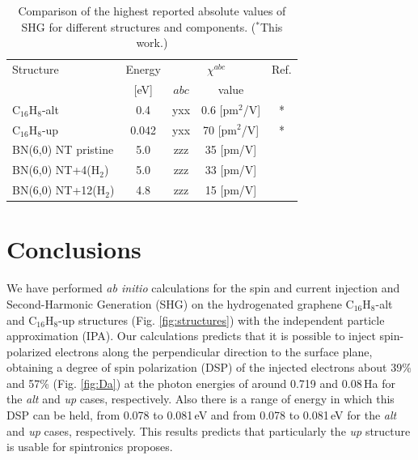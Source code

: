 \documentclass[pss]{wiley2sp} %
\begin{document}
\begin{table}[htb]%
  \sidecaption
  \begin{tabular}{lcccc}
  \hline
    Structure & Energy & \multicolumn{2}{c}{$\chi^{abc} $} &  Ref.\\
    \cline{3-4}
              & [eV]   & $abc$ & value \\
    \hline
    C$_{16}$H$_{8}$-alt    & 0.4   & yxx   & 0.6 [pm$^{2}$/V]  & *     \\
    C$_{16}$H$_{8}$-up     & 0.042 & yxx   & 70  [pm$^{2}$/V]  & *     \\
    BN(6,0) NT pristine    & 5.0   & zzz   & 35  [pm/V]  & \cite{salazar2014molecular} \\
    BN(6,0) NT+4(H$_{2}$)  & 5.0   & zzz   & 33  [pm/V]  & \cite{salazar2014molecular} \\
    BN(6,0) NT+12(H$_{2}$) & 4.8   & zzz   & 15  [pm/V]  & \cite{salazar2014molecular} \\
  \hline
  \end{tabular}
  \caption[]{%
  Comparison of the highest reported absolute values of SHG for 
    different structures and components. ($^{*}$This work.)}
  \label{tab:shgcomp}
\end{table}




\section{Conclusions} %
\label{sec:conclusions}

We have performed \emph{ab initio} calculations for the spin and current injection and
Second-Harmonic Generation (SHG) on the hydrogenated graphene C$_{16}$H$_{8}$-alt and
C$_{16}$H$_{8}$-up structures (Fig. \ref{fig:structures}) with the
independent particle approximation (IPA). Our calculations predicts that it is
possible to inject spin-polarized electrons along the perpendicular direction
to the surface plane, obtaining a degree of spin polarization (DSP) of the
injected electrons about 39\% and 57\%  (Fig. \ref{fig:Da}) at the photon energies of around 0.719
and 0.08\,Ha  for the \emph{alt} and \emph{up} cases, respectively. Also there is a range of energy
in which this DSP can be held, from 0.078 to 0.081\,eV and from 0.078 to 0.081\,eV for the \emph{alt} and \emph{up} cases, respectively. This results predicts that particularly the \emph{up} structure is usable for spintronics proposes.
\end{document}
